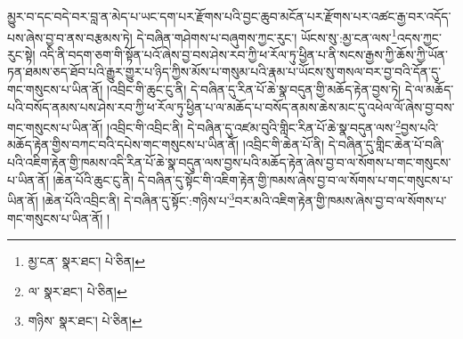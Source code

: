 མྱུར་བ་དང་བདེ་བར་བླ་ན་མེད་པ་ཡང་དག་པར་རྫོགས་པའི་བྱང་ཆུབ་མངོན་པར་རྫོགས་པར་འཚང་རྒྱ་བར་འདོད་པས་ཞེས་བྱ་བ་ནས་བརྩམས་ཏེ། དེ་བཞིན་གཤེགས་པ་བཞུགས་ཀྱང་རུང་། ཡོངས་སུ་:མྱ་ངན་ལས་\footnote{མྱ་ངན་  སྣར་ཐང་།  པེ་ཅིན། }འདས་ཀྱང་རུང་སྟེ། འདི་ནི་བདག་ཅག་གི་སྟོན་པའོ་ཞེས་བྱ་བས་ཤེས་རབ་ཀྱི་ཕ་རོལ་ཏུ་ཕྱིན་པ་ནི་སངས་རྒྱས་ཀྱི་ཆོས་ཀྱི་ཡོན་ཏན་ཐམས་ཅད་ཐོབ་པའི་རྒྱུར་གྱུར་པ་ཉིད་ཀྱིས་མོས་པ་གསུམ་པའི་རྣམ་པ་ཡོངས་སུ་གསལ་བར་བྱ་བའི་དོན་དུ་གང་གསུངས་པ་ཡིན་ནོ། །འབྲིང་གི་ཆུང་ངུ་ནི། དེ་བཞིན་དུ་རིན་པོ་ཆེ་སྣ་བདུན་གྱི་མཆོད་རྟེན་བྱས་ཏེ། དེ་ལ་མཆོད་པའི་བསོད་ནམས་པས་ཤེས་རབ་ཀྱི་ཕ་རོལ་ཏུ་ཕྱིན་པ་ལ་མཆོད་པ་བསོད་ནམས་ཆེས་མང་དུ་འཕེལ་ལོ་ཞེས་བྱ་བས་གང་གསུངས་པ་ཡིན་ནོ། །འབྲིང་གི་འབྲིང་ནི། དེ་བཞིན་དུ་འཛམ་བུའི་གླིང་རིན་པོ་ཆེ་སྣ་བདུན་ལས་\footnote{ལ་  སྣར་ཐང་།  པེ་ཅིན། }བྱས་པའི་མཆོད་རྟེན་གྱིས་བཀང་བའི་དཔེས་གང་གསུངས་པ་ཡིན་ནོ། །འབྲིང་གི་ཆེན་པོ་ནི། དེ་བཞིན་དུ་གླིང་ཆེན་པོ་བཞི་པའི་འཇིག་རྟེན་གྱི་ཁམས་འདི་རིན་པོ་ཆེ་སྣ་བདུན་ལས་བྱས་པའི་མཆོད་རྟེན་ཞེས་བྱ་བ་ལ་སོགས་པ་གང་གསུངས་པ་ཡིན་ནོ། །ཆེན་པོའི་ཆུང་ངུ་ནི། དེ་བཞིན་དུ་སྟོང་གི་འཇིག་རྟེན་གྱི་ཁམས་ཞེས་བྱ་བ་ལ་སོགས་པ་གང་གསུངས་པ་ཡིན་ནོ། །ཆེན་པོའི་འབྲིང་ནི། དེ་བཞིན་དུ་སྟོང་:གཉིས་པ་\footnote{གཉིས་  སྣར་ཐང་།  པེ་ཅིན། }བར་མའི་འཇིག་རྟེན་གྱི་ཁམས་ཞེས་བྱ་བ་ལ་སོགས་པ་གང་གསུངས་པ་ཡིན་ནོ། །
